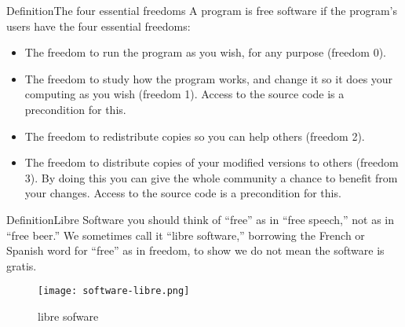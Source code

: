 \documentclass{beamer}
\begin{document}
    \begin{frame}{Definition}{The four essential freedoms}
        A program is free software if the program's users have the four essential freedoms\cite{GNUDOTORG:1}:
        \begin{itemize}
            \item The freedom to run the program as you wish, for any purpose (freedom 0).
            \item The freedom to study how the program works, and change it so it does your computing as you wish (freedom 1). Access to the source code is a precondition for this.
            \item The freedom to redistribute copies so you can help others (freedom 2).
            \item The freedom to distribute copies of your modified versions to others (freedom 3). By doing this you can give the whole community a chance to benefit from your changes. Access to the source code is a precondition for this.        \end{itemize}
    \end{frame}

    \begin{frame}{Definition}{Libre Software}
        you should think of “free” as in “free speech,” not as in “free beer.”
        We sometimes call it “libre software,” borrowing the French or Spanish word for “free” as in freedom, to show we do not mean the software is gratis.\cite{GNUDOTORG:1}
        \begin{figure}
            \centering
                \texttt{[image: software-libre.png]}
                \caption{libre sofware\cite{softwareLibre}}
        \end{figure}
    \end{frame}
\end{document}
